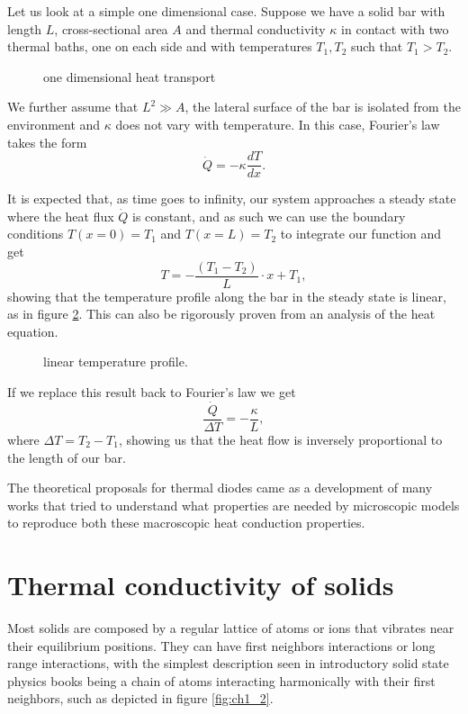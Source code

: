 Let us look at a simple one dimensional case. Suppose we have a solid bar with length $ L $, cross-sectional area $ A $ and thermal conductivity $ \kappa $ in contact with two thermal baths, one on each side and with temperatures $ T_{1}, T_{2} $ such that $ T_{1}>T_{2} $.

\begin{figure}[H] 
	\centering 
	\fontsize{18}{14} 
	\label{ch2_1} 
	\caption{one dimensional heat transport}
\end{figure} 


We further assume that $ L^{2} \gg A $, the lateral surface of the bar is isolated from the environment and $ \kappa $ does not vary with temperature. In this case, Fourier's law takes the form
\[ \dot{Q} = -\kappa \frac{d T}{d x}. \]

It is expected that, as time goes to infinity, our system approaches a steady state where the heat flux $ \dot{Q} $ is constant, and as such we can use the boundary conditions $ T(x=0)=T_{1} $ and $ T(x=L)=T_{2} $ to integrate our function and get
\[ T = - \frac{(T_{1}-T_{2})}{L}\cdot x + T_{1}, \]
showing that the temperature profile along the bar in the steady state is linear, as in figure \ref{ch2_2}. This can also be rigorously proven from an analysis of the heat equation.

\begin{figure}[H] 
	\centering 
	\fontsize{26}{14} 
	\label{ch2_2} 
	\caption{linear temperature profile.}
\end{figure} 

If we replace this result back to Fourier's law we get 
\[ 
\frac{\dot{Q} }{\Delta T } = -\frac{\kappa }{L },
\]
where $ \Delta T = T_{2} - T_{1} $, showing us that the heat flow is inversely proportional to the length of our bar.

The theoretical proposals for thermal diodes came as a development of many works that tried to understand what properties are needed by microscopic models to reproduce both these macroscopic heat conduction properties.

\section{Thermal conductivity of solids}

Most solids are composed by a regular lattice of atoms or ions that vibrates near their equilibrium positions. They can have first neighbors interactions or long range interactions, with the simplest description seen in introductory solid state physics books being a chain of atoms interacting harmonically with their first neighbors, such as depicted in figure \ref{fig:ch1_2}.


